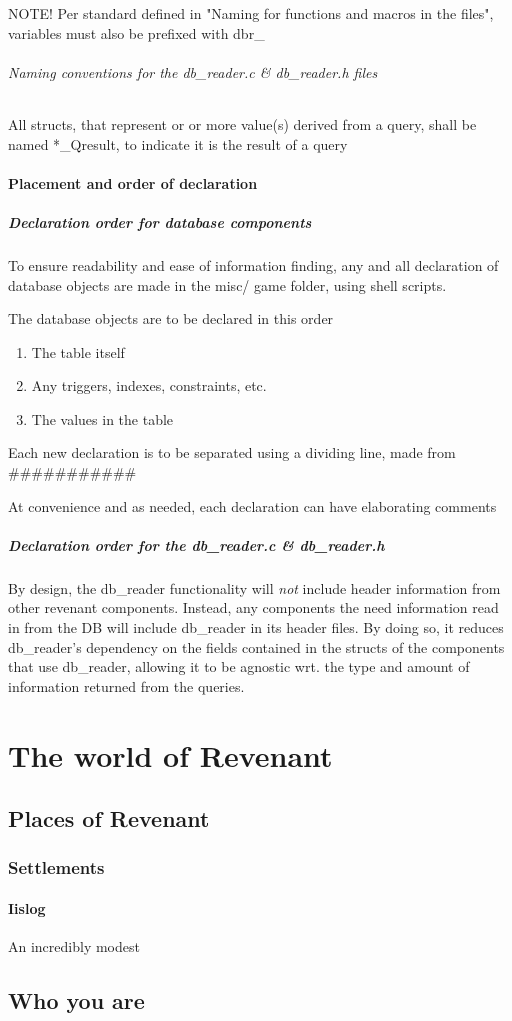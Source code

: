 \documentclass{report}
\begin{document}
NOTE! Per standard defined in "Naming for functions and macros in the files", variables must also be prefixed with dbr\_
\subparagraph*{Naming conventions for the db\_reader.c \& db\_reader.h files}
All structs, that represent or or more value(s) derived from a query, shall be named *\_Qresult, to indicate it is the result of a query
\subsubsection*{Placement and order of declaration}
\paragraph*{Declaration order for database components}
To ensure readability and ease of information finding, any and all declaration of database objects are made in the misc/ game folder, using shell scripts.

The database objects are to be declared in this order
\begin{enumerate}
\item The table itself
\item Any triggers, indexes, constraints, etc.
\item The values in the table
\end{enumerate}

Each new declaration is to be separated using a dividing line, made from \#\#\#\#\#\#\#\#\#\#\#

At convenience and as needed, each declaration can have elaborating comments
\paragraph*{Declaration order for the db\_reader.c \& db\_reader.h}
By design, the db\_reader functionality will \textit{not} include header information from other revenant components. Instead, any components the need information read in from the DB will include db\_reader in its header files. By doing so, it reduces db\_reader's dependency on the fields contained in the structs of the components that use db\_reader, allowing it to be agnostic wrt. the type and amount of information returned from the queries. 
\chapter*{The world of Revenant}

\section*{Places of Revenant}
\subsection*{Settlements}
\subsubsection*{Iislog}
An incredibly modest 
\section*{Who you are}
\end{document}
